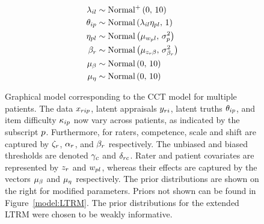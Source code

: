 \documentclass[a4paper,usenames,dvipsnames]{article}
\begin{document}
\begin{figure}[!ht]
\begin{minipage}{0.4\textwidth}
{\begin{align*}
	\lambda_{il}		&\sim 	\text{Normal\textsuperscript{+}}\left(0,\,10\right)																	\\
	\theta_{ip} 			&\sim 	\text{Normal}\left(\lambda_{il}\eta_{pl},\,1\right)						\\
	\eta_{pl} 		&\sim 	\text{Normal}\left(\mu_{w_{p}l},\,\sigma_{p}^2\right)		\\
	\beta_r   					&\sim 	\text{Normal}\left(\mu_{z_r\beta},\,\sigma_{\beta_r}^2\right)\\
	\mu_{\beta}						&\sim 	\text{Normal}\left(0,\,10\right)																	\\
	\mu_{\eta}						&\sim 	\text{Normal}\left(0,\,10\right)
	\end{align*}
}%
\end{minipage}
	\caption{Graphical model corresponding to the CCT model for multiple patients. The data $x_{rip}$, latent appraisals $y_{ri}$, latent truths $\theta_{ip}$, and item difficulty $\kappa_{ip}$ now vary across patients, as indicated by the subscript $p$. Furthermore, for raters, competence, scale and shift are captured by $\zeta_r$, $\alpha_r$, and $\beta_r$ respectively. The unbiased and biased thresholds are denoted $\gamma_c$ and $\delta_{rc}$. Rater and patient covariates are represented by $z_r$ and $w_{pl}$, whereas their effects are captured by the vectors $\mu_{\beta}$ and $\mu_{\eta}$ respectively. The prior distributions are shown on the right for modified parameters. Priors not shown can be found in Figure~\ref{model:LTRM}. The prior distributions for the extended LTRM were chosen to be weakly informative.}%
	\label{model:LTRM3}
\end{figure}
\end{document}
